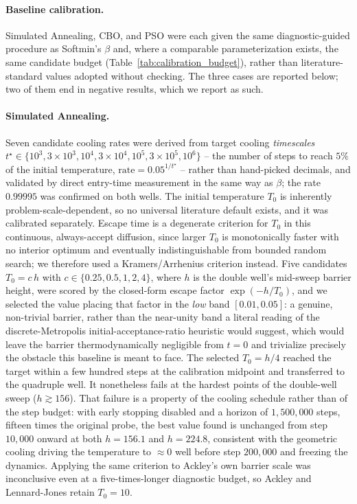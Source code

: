 \documentclass{article} %
\theoremstyle{plain}
\theoremstyle{definition}
\theoremstyle{remark}
\begin{document}
\paragraph{Baseline calibration.} Simulated Annealing, CBO, and PSO were each given the same diagnostic-guided procedure as Softmin's $\beta$ and, where a comparable parameterization exists, the same candidate budget (Table~\ref{tab:calibration_budget}), rather than literature-standard values adopted without checking. The three cases are reported below; two of them end in negative results, which we report as such.

\paragraph{Simulated Annealing.} Seven candidate cooling rates were derived from target cooling \emph{timescales} $t^\star\in\{10^3,3{\times}10^3,10^4,3{\times}10^4,10^5,3{\times}10^5,10^6\}$ -- the number of steps to reach $5\%$ of the initial temperature, $\text{rate}=0.05^{1/t^\star}$ -- rather than hand-picked decimals, and validated by direct entry-time measurement in the same way as $\beta$; the rate $0.99995$ was confirmed on both wells. The initial temperature $T_0$ is inherently problem-scale-dependent, so no universal literature default exists, and it was calibrated separately. Escape time is a degenerate criterion for $T_0$ in this continuous, always-accept diffusion, since larger $T_0$ is monotonically faster with no interior optimum and eventually indistinguishable from bounded random search; we therefore used a Kramers/Arrhenius criterion instead. Five candidates $T_0=c\,h$ with $c\in\{0.25,0.5,1,2,4\}$, where $h$ is the double well's mid-sweep barrier height, were scored by the closed-form escape factor $\exp(-h/T_0)$, and we selected the value placing that factor in the \emph{low} band $[0.01,0.05]$: a genuine, non-trivial barrier, rather than the near-unity band a literal reading of the discrete-Metropolis initial-acceptance-ratio heuristic \citep{kirkpatrick1983optimization} would suggest, which would leave the barrier thermodynamically negligible from $t=0$ and trivialize precisely the obstacle this baseline is meant to face. The selected $T_0=h/4$ reached the target within a few hundred steps at the calibration midpoint and transferred to the quadruple well. It nonetheless fails at the hardest points of the double-well sweep ($h\gtrsim156$). That failure is a property of the cooling schedule rather than of the step budget: with early stopping disabled and a horizon of $1{,}500{,}000$ steps, fifteen times the original probe, the best value found is unchanged from step $10{,}000$ onward at both $h=156.1$ and $h=224.8$, consistent with the geometric cooling driving the temperature to $\approx0$ well before step $200{,}000$ and freezing the dynamics. Applying the same criterion to Ackley's own barrier scale was inconclusive even at a five-times-longer diagnostic budget, so Ackley and Lennard-Jones retain $T_0=10$.
\end{document}
